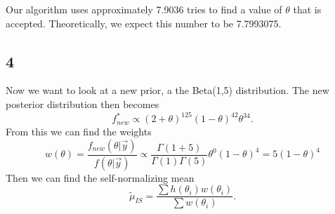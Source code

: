 \documentclass[
]{article}
\begin{document}
Our algorithm uses approximately 7.9036 tries to find a value of
\(\theta\) that is accepted. Theoretically, we expect this number to be
7.7993075.

\hypertarget{section-7}{%
\subsection{4}\label{section-7}}

Now we want to look at a new prior, a the Beta(1,5) distribution. The
new posterior distribution then becomes \[\begin{equation}
  f_{new}^* \propto (2+\theta)^{125}(1-\theta)^{42}\theta^{34}.
\end{equation}\] From this we can find the weights \[\begin{equation}
  w(\theta) = \frac{f_{new}(\theta|\vec y)}{f(\theta|\vec y)} \propto \frac{\Gamma(1+5)}{\Gamma(1)\Gamma(5)}\theta^0(1-\theta)^4 = 5(1-\theta)^4
\end{equation}\] Then we can find the self-normalizing mean
\[\begin{equation}
  \tilde\mu_{IS}=\frac{\sum h(\theta_i)w(\theta_i)}{\sum w(\theta_i)}.
\end{equation}\]
\end{document}
